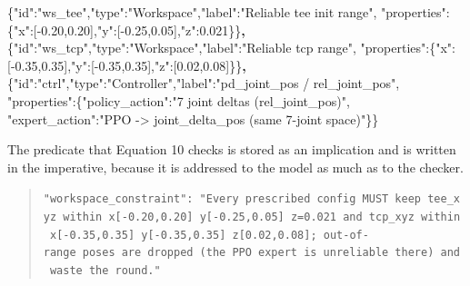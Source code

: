 \documentclass[
  11pt,
]{article}
\newenvironment{Shaded}{}{}
\newcommand{\DataTypeTok}[1]{\textcolor[rgb]{0.56,0.13,0.00}{#1}}
\newcommand{\ErrorTok}[1]{\textcolor[rgb]{1.00,0.00,0.00}{\textbf{#1}}}
\newcommand{\FloatTok}[1]{\textcolor[rgb]{0.25,0.63,0.44}{#1}}
\newcommand{\FunctionTok}[1]{\textcolor[rgb]{0.02,0.16,0.49}{#1}}
\newcommand{\OtherTok}[1]{\textcolor[rgb]{0.00,0.44,0.13}{#1}}
\newcommand{\StringTok}[1]{\textcolor[rgb]{0.25,0.44,0.63}{#1}}
\begin{document}
\begin{Shaded}
\begin{Highlighting}[]
\FunctionTok{\{}\DataTypeTok{"id"}\FunctionTok{:}\StringTok{"ws\_tee"}\FunctionTok{,}\DataTypeTok{"type"}\FunctionTok{:}\StringTok{"Workspace"}\FunctionTok{,}\DataTypeTok{"label"}\FunctionTok{:}\StringTok{"Reliable tee init range"}\FunctionTok{,}
 \DataTypeTok{"properties"}\FunctionTok{:\{}\DataTypeTok{"x"}\FunctionTok{:}\OtherTok{[}\FloatTok{{-}0.20}\OtherTok{,}\FloatTok{0.20}\OtherTok{]}\FunctionTok{,}\DataTypeTok{"y"}\FunctionTok{:}\OtherTok{[}\FloatTok{{-}0.25}\OtherTok{,}\FloatTok{0.05}\OtherTok{]}\FunctionTok{,}\DataTypeTok{"z"}\FunctionTok{:}\FloatTok{0.021}\FunctionTok{\}\}}\ErrorTok{,}
\FunctionTok{\{}\DataTypeTok{"id"}\FunctionTok{:}\StringTok{"ws\_tcp"}\FunctionTok{,}\DataTypeTok{"type"}\FunctionTok{:}\StringTok{"Workspace"}\FunctionTok{,}\DataTypeTok{"label"}\FunctionTok{:}\StringTok{"Reliable tcp range"}\FunctionTok{,}
 \DataTypeTok{"properties"}\FunctionTok{:\{}\DataTypeTok{"x"}\FunctionTok{:}\OtherTok{[}\FloatTok{{-}0.35}\OtherTok{,}\FloatTok{0.35}\OtherTok{]}\FunctionTok{,}\DataTypeTok{"y"}\FunctionTok{:}\OtherTok{[}\FloatTok{{-}0.35}\OtherTok{,}\FloatTok{0.35}\OtherTok{]}\FunctionTok{,}\DataTypeTok{"z"}\FunctionTok{:}\OtherTok{[}\FloatTok{0.02}\OtherTok{,}\FloatTok{0.08}\OtherTok{]}\FunctionTok{\}\}}\ErrorTok{,}
\FunctionTok{\{}\DataTypeTok{"id"}\FunctionTok{:}\StringTok{"ctrl"}\FunctionTok{,}\DataTypeTok{"type"}\FunctionTok{:}\StringTok{"Controller"}\FunctionTok{,}\DataTypeTok{"label"}\FunctionTok{:}\StringTok{"pd\_joint\_pos / rel\_joint\_pos"}\FunctionTok{,}
 \DataTypeTok{"properties"}\FunctionTok{:\{}\DataTypeTok{"policy\_action"}\FunctionTok{:}\StringTok{"7 joint deltas (rel\_joint\_pos)"}\FunctionTok{,}
               \DataTypeTok{"expert\_action"}\FunctionTok{:}\StringTok{"PPO {-}\textgreater{} joint\_delta\_pos (same 7{-}joint space)"}\FunctionTok{\}\}}
\end{Highlighting}
\end{Shaded}

The predicate that Equation 10 checks is stored as an implication and is
written in the imperative, because it is addressed to the model as much
as to the checker.

\begin{quote}
\texttt{"workspace\_constraint":\ "Every\ prescribed\ config\ MUST\ keep\ tee\_xyz\ within\ x{[}-0.20,0.20{]}\ y{[}-0.25,0.05{]}\ z=0.021\ and\ tcp\_xyz\ within\ x{[}-0.35,0.35{]}\ y{[}-0.35,0.35{]}\ z{[}0.02,0.08{]};\ out-of-range\ poses\ are\ dropped\ (the\ PPO\ expert\ is\ unreliable\ there)\ and\ waste\ the\ round."}
\end{quote}
\end{document}
